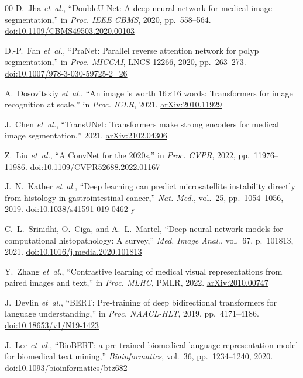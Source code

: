 \documentclass[conference]{IEEEtran}
\begin{document}
\begin{thebibliography}{00}
D.~Jha \emph{et~al.}, ``DoubleU-Net: A deep neural network for medical image
segmentation,'' in \textit{Proc. IEEE CBMS}, 2020, pp.~558--564.
\href{https://doi.org/10.1109/CBMS49503.2020.00103}{doi:10.1109/CBMS49503.2020.00103}

D.-P.~Fan \emph{et~al.}, ``PraNet: Parallel reverse attention network for
polyp segmentation,'' in \textit{Proc. MICCAI}, LNCS 12266, 2020, pp.~263--273.
\href{https://doi.org/10.1007/978-3-030-59725-2_26}{doi:10.1007/978-3-030-59725-2\_26}

A.~Dosovitskiy \emph{et~al.}, ``An image is worth 16$\times$16 words:
Transformers for image recognition at scale,'' in \textit{Proc. ICLR}, 2021.
\href{https://arxiv.org/abs/2010.11929}{arXiv:2010.11929}

J.~Chen \emph{et~al.}, ``TransUNet: Transformers make strong encoders for
medical image segmentation,'' 2021.
\href{https://arxiv.org/abs/2102.04306}{arXiv:2102.04306}

Z.~Liu \emph{et~al.}, ``A ConvNet for the 2020s,''
in \textit{Proc. CVPR}, 2022, pp.~11976--11986.
\href{https://doi.org/10.1109/CVPR52688.2022.01167}{doi:10.1109/CVPR52688.2022.01167}

J.~N.~Kather \emph{et~al.}, ``Deep learning can predict microsatellite
instability directly from histology in gastrointestinal cancer,''
\textit{Nat. Med.}, vol.~25, pp.~1054--1056, 2019.
\href{https://doi.org/10.1038/s41591-019-0462-y}{doi:10.1038/s41591-019-0462-y}

C.~L.~Srinidhi, O.~Ciga, and A.~L.~Martel, ``Deep neural network models for
computational histopathology: A survey,''
\textit{Med. Image Anal.}, vol.~67, p.~101813, 2021.
\href{https://doi.org/10.1016/j.media.2020.101813}{doi:10.1016/j.media.2020.101813}

Y.~Zhang \emph{et~al.}, ``Contrastive learning of medical visual
representations from paired images and text,''
in \textit{Proc. MLHC}, PMLR, 2022.
\href{https://arxiv.org/abs/2010.00747}{arXiv:2010.00747}

J.~Devlin \emph{et~al.}, ``BERT: Pre-training of deep bidirectional
transformers for language understanding,''
in \textit{Proc. NAACL-HLT}, 2019, pp.~4171--4186.
\href{https://doi.org/10.18653/v1/N19-1423}{doi:10.18653/v1/N19-1423}

J.~Lee \emph{et~al.}, ``BioBERT: a pre-trained biomedical language
representation model for biomedical text mining,''
\textit{Bioinformatics}, vol.~36, pp.~1234--1240, 2020.
\href{https://doi.org/10.1093/bioinformatics/btz682}{doi:10.1093/bioinformatics/btz682}


\end{thebibliography}
\end{document}
